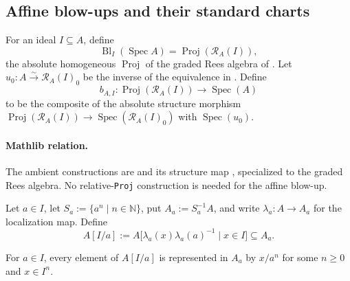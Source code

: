 \subsection{Affine blow-ups and their standard charts}

\begin{definition}
  \label{def:nagata-affine-blowup}
  \leanok

  For an ideal $I\subseteq A$, define
  \[
    \operatorname{Bl}_I(\operatorname{Spec}A)
      =\operatorname{Proj}(\mathcal R_A(I)),
  \]
  the absolute homogeneous \(\operatorname{Proj}\) of the graded Rees
  algebra of .  Let
  $u_0\colon A\xrightarrow{\sim}\mathcal R_A(I)_0$ be the inverse of
  the equivalence in .  Define
  \[
    b_{A,I}\colon\operatorname{Proj}(\mathcal R_A(I))\longrightarrow
      \operatorname{Spec}(A)
  \]
  to be the composite of the absolute structure morphism
  $\operatorname{Proj}(\mathcal R_A(I))\to
   \operatorname{Spec}(\mathcal R_A(I)_0)$ with
  $\operatorname{Spec}(u_0)$.

  \paragraph{Mathlib relation.}
  The ambient constructions are
  \texttt{} and its structure map
  \texttt{}, specialized to the graded
  Rees algebra.  No relative-\texttt{Proj} construction is needed for the
  affine blow-up.
\end{definition}

\begin{definition}
  \label{def:nagata-blowup-chart-ring}
  \lean{}

  Let $a\in I$, let $S_a:=\{a^n\mid n\in\mathbb N\}$, put
  $A_a:=S_a^{-1}A$, and write $\lambda_a\colon A\to A_a$ for the localization
  map.  Define
  \[
    A[I/a]:=A\bigl[\lambda_a(x)\lambda_a(a)^{-1}\mid x\in I\bigr]
      \subseteq A_a.
  \]
\end{definition}

\begin{lemma}
  \label{lemma:nagata-chart-ring-normal-form}
  \lean{}

  For $a\in I$, every element of $A[I/a]$ is represented in $A_a$ by $x/a^n$ for some
  $n\geq 0$ and $x\in I^n$.
\end{lemma}

